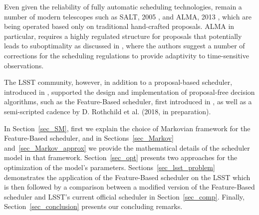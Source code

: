 \documentclass[12pt]{aastex62}
\theoremstyle{definition}
\begin{document}
Even given the reliability of fully automatic scheduling technologies, remain a number of modern telescopes such as SALT, 2005 \citep{brink2008salt}, and ALMA, 2013 \citep{wootten2003atacama}, which are being operated based only on traditional hand-crafted proposals. ALMA in particular, requires a highly regulated structure for proposals that potentially leads to suboptimality as discussed in \citep{alexander2017enabling}, where the authors suggest a number of corrections for the scheduling regulations to provide adaptivity to time-sensitive observations.

The LSST community, however, in addition to a proposal-based scheduler, introduced in \citep{delgado2016lsst}, supported the design and implementation of proposal-free decision algorithms, such as the Feature-Based scheduler, first introduced in \citep{naghib2016feature}, as well as a semi-scripted cadence by D. Rothchild et al. (2018, in preparation).

In Section~\ref{sec_SM}, first we explain the choice of Markovian framework for the Feature-Based scheduler, and in Sections~\ref{sec_Markov} and~\ref{sec_Markov_approx} we provide the mathematical details of the scheduler model in that framework. Section~\ref{sec_opt} presents two approaches for the optimization of the model's parameters. Sections~\ref{sec_lsst_problem} demonstrates the application of the Feature-Based scheduler on the LSST which is then followed by a comparison between a modified version of the Feature-Based scheduler and LSST's current official scheduler in Section~\ref{sec_comp}. Finally, Section~\ref{sec_conclusion} presents our concluding remarks.
\end{document}
